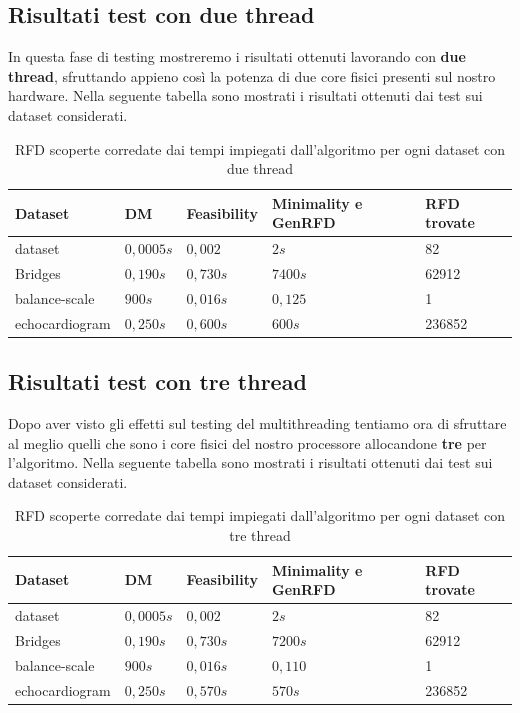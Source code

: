 \subsection{Risultati test con due thread}
In questa fase di testing mostreremo i risultati ottenuti lavorando con \textbf{due thread}, sfruttando appieno così la potenza di due core fisici presenti sul nostro hardware.
Nella seguente tabella sono mostrati i risultati ottenuti dai test sui dataset considerati.
\begin{table}[H]
	\centering
	\begin{tabular}{lllll}
		Dataset & DM & Feasibility & Minimality e GenRFD & RFD trovate \\
		\hline
		dataset& $0,0005s$ & $0,002$ & $2s$ & 82 \\
		Bridges & $0,190s$  & $0,730s$ & $7400s$ & 62912 \\
		balance-scale  & $900s$  & $0,016s$ & $0,125$ & 1\\
		echocardiogram  & $0,250s$  & $0,600s$ & $600s$ & 236852\\
		\hline
	\end{tabular}
	\label{risultati_2_thread}
	\caption{RFD scoperte corredate dai tempi impiegati dall'algoritmo per ogni dataset con due thread}
\end{table}
\subsection{Risultati test con tre thread}
Dopo aver visto gli effetti sul testing del multithreading tentiamo ora di sfruttare al meglio quelli che sono i core fisici del nostro processore allocandone \textbf{tre} per l'algoritmo.
Nella seguente tabella sono mostrati i risultati ottenuti dai test sui dataset considerati.
\begin{table}[H]
	\centering
	\begin{tabular}{lllll}
		Dataset & DM & Feasibility & Minimality e GenRFD & RFD trovate \\
		\hline
		dataset& $0,0005s$ & $0,002$ & $2s$ & 82 \\
		Bridges & $0,190s$  & $0,730s$ & $7200s$ & 62912 \\
		balance-scale  & $900s$  & $0,016s$ & $0,110$ & 1\\
		echocardiogram  & $0,250s$  & $0,570s$ & $570s$ & 236852\\
		\hline
	\end{tabular}
	\label{risultati_3_thread}
	\caption{RFD scoperte corredate dai tempi impiegati dall'algoritmo per ogni dataset con tre thread}
\end{table}
